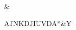 \documentclass{memoir}
\begin{document}
\begin{fboxverbatim}
&%

AJNKDJIUVDA*&Y
\end{fboxverbatim}
\end{document}
